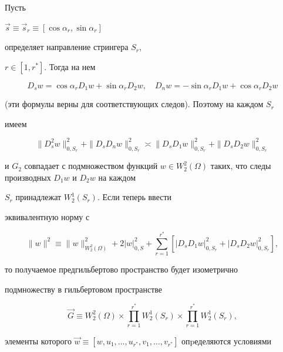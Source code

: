 \begin{pf} Пусть


$\Vec s\equiv \Vec s_r\equiv[\cos\alpha_r,\sin\alpha_r]$


определяет направление стрингера $S_r$, \linebreak




$r\in[1,r^*].$ Тогда на нем


$$


D_sw=\cos\alpha_rD_1w+\sin\alpha_rD_2w,\quad


D_nw=-\sin\alpha_rD_1w+\cos\alpha_rD_2w


$$


(эти формулы верны для соответствующих следов). Поэтому на каждом $S_r$


 имеем


$$


\|D^2_sw\|^2_{0,S_r}+\|D_sD_nw\|^2_{0,S_r}


\asymp \|D_sD_1w\|^2_{0,S_r}+\|D_sD_2w\|^2_{0,S_r}


$$


и $G_2$ совпадает с подмножеством функций $w\in


W_2^2(\Omega)$ таких, что следы производных $D_1w$ и $D_2w$ на каждом


$S_r$ принадлежат $W_2^1(S_r).$ Если теперь ввести


эквивалентную норму с


$$


\|w\|^2\equiv


\|w\|^2_{W_2^2 (\Omega)}+2|w|^2_{0,S}+


\sum_{r=1}^{r^*}[|D_sD_1w|^2_{0,S_r}+ |D_sD_2w|^2_{0,S_r}],


$$


то получаемое предгильбертово пространство будет изометрично


подмно\-жеству в гильбертовом пространстве


$$


\Vec G\equiv W_2^2 (\Omega)\times\prod_{r=1}^{r^*}


 W_2^1(S_r)\times\prod_{r=1}^{r^*}W_2^1(S_r),


$$


элементы которого $\Vec w\equiv[w,u_1,\dotsc,u_{r^*},


v_1,\dotsc,v_{r^*}]$ опpеделяются условиями





\begin{equation}



\end{equation}
\end{pf}
